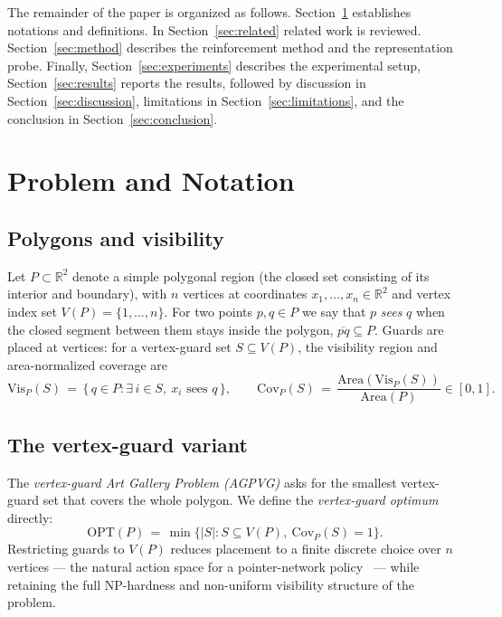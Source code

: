 \documentclass[preprint,10pt]{elsarticle}
\newcommand{\Vis}[1]{\mathrm{Vis}_P(#1)}
\newcommand{\Covf}[1]{\mathrm{Cov}_P(#1)}
\newcommand{\Area}[1]{\mathrm{Area}(#1)}
\newcommand{\OPT}{\mathrm{OPT}}
\begin{document}
The remainder of the paper is organized as follows. Section~\ref{sec:problem} establishes notations and definitions. In Section~\ref{sec:related} related work is reviewed. Section~\ref{sec:method} describes the reinforcement method and the representation probe. Finally, Section~\ref{sec:experiments} describes the experimental setup, Section~\ref{sec:results} reports the results, followed by discussion in Section~\ref{sec:discussion}, limitations in Section~\ref{sec:limitations}, and the conclusion in Section~\ref{sec:conclusion}.

\section{Problem and Notation}
\label{sec:problem}

\subsection{Polygons and visibility}
\label{sec:problem-polygon}

Let $P \subset \mathbb{R}^2$ denote a simple polygonal region (the closed set consisting of its interior and boundary), with $n$ vertices at coordinates $x_1, \dots, x_n \in \mathbb{R}^2$ and vertex index set $V(P) = \{1, \dots, n\}$. For two points $p,q\in P$  we say that $p$ \emph{sees} $q$ when the closed segment between them stays inside the polygon, $\overline{pq} \subseteq P$. Guards are placed at vertices: for a vertex-guard set $S \subseteq V(P)$, the visibility region and area-normalized coverage are
\begin{equation}
\Vis{S} \,=\, \{\, q \in P : \exists\, i \in S,\ x_i \text{ sees } q \,\},
\qquad
\Covf{S} \,=\, \frac{\Area{\Vis{S}}}{\Area{P}} \in [0,1].
\label{eq:vis-cov}
\end{equation}

\subsection{The vertex-guard variant}
\label{sec:problem-vertex}

The \emph{vertex-guard Art Gallery Problem (AGPVG)} asks for the smallest vertex-guard set that covers the whole polygon. We define the \emph{vertex-guard optimum} directly:
\begin{equation}
\OPT(P) \,=\, \min\bigl\{|S| : S \subseteq V(P),\ \Covf{S} = 1\bigr\}.
\label{eq:opt}
\end{equation}
Restricting guards to $V(P)$ reduces placement to a finite discrete choice over $n$ vertices --- the natural action space for a pointer-network policy~\cite{Vinyals2015,Bello2016,Kool2019Attention,Kwon2020POMO} --- while retaining the full NP-hardness and non-uniform visibility structure of the problem.
\end{document}
